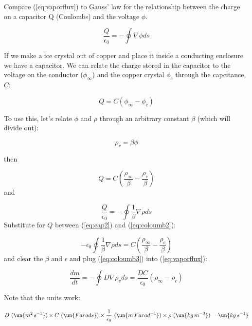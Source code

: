 \documentclass[12pt]{article}
\begin{document}
Compare (\ref{eq:vaporflux}) to Gauss' law for the relationship
between the charge on a capacitor Q (Coulombs) and
the voltage $\phi$.

\begin{equation}
  \label{eq:coloumb}
\frac{ Q}{\epsilon_0}  = - \oint  \nabla   \phi ds
\end{equation}

If we make a ice crystal out of copper and place it inside
a conducting enclosure we have a capacitor.  We can relate
the charge stored in the capacitor to the voltage on the
conductor ($\phi_\infty$) and the copper crystal $\phi_c$
through the capcitance, $C$:

\begin{equation}
  \label{eq:cap}
  Q = C ( \phi_\infty - \phi_c )
\end{equation}

To use this, let's relate $\phi$ and $\rho$ through
an arbitrary constant $\beta$ (which will divide out):

\begin{equation}
  \label{eq:beta}
  \rho_v = \beta \phi
\end{equation}

then

\begin{equation}
  \label{eq:cap2}
  Q = C ( \frac{\rho_\infty}{\beta}  - \frac{\rho_c}{\beta} )
\end{equation}
and 

\begin{equation}
  \label{eq:coloumb2}
\frac{ Q}{\epsilon_0}  = - \oint \frac{1}{\beta} \nabla \rho   ds
\end{equation}
Substitute for $Q$ between (\ref{eq:cap2}) and (\ref{eq:coloumb2}):

\begin{equation}
  \label{eq:coloumb3}
- \epsilon_0 \oint \frac{1}{\beta} \nabla \rho   ds = C ( \frac{\rho_\infty}{\beta}  - \frac{\rho_c}{\beta} )
\end{equation}
and clear the $\beta$ and $\epsilon$ and plug (\ref{eq:coloumb3}) into (\ref{eq:vaporflux}):

\begin{equation}
  \label{eq:vaporflux2}
\frac{ dm}{dt} =  - \oint D \nabla   \rho_v ds =
\frac{D C }{\epsilon_0} \left ( \rho_\infty - \rho_c \right )
\end{equation}

Note that the units work:  


\begin{equation}
  \label{eq:units}
D\ (\un{m^2\,s^{-1}}) \times C\ (\un{Farads}) \times \frac{ 1}{\epsilon_0}
\ ( \un{m\,Farad^{-1}} ) \times \rho \ (\un{kg\,m^{-3}} ) = \un{kg\,s^{-1}}
\end{equation}
\end{document}
